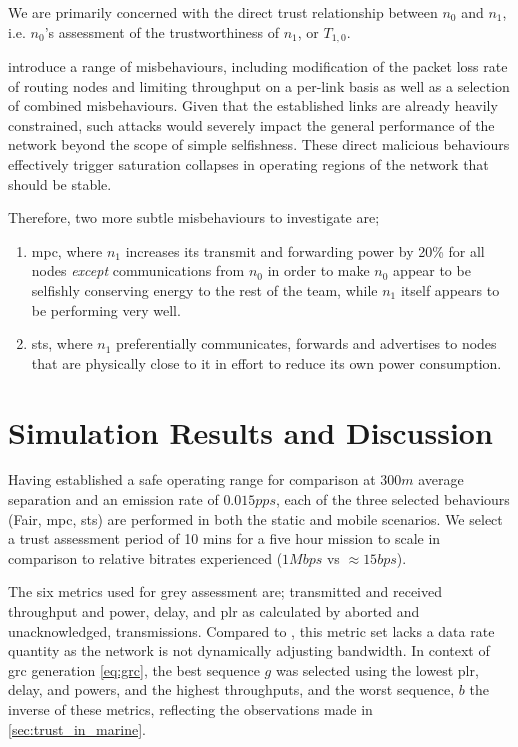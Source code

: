We are primarily concerned with the direct trust relationship between $n_0$ and $n_1$, i.e. $n_0$'s assessment of the trustworthiness of $n_1$, or $T_{1,0}$.

\citet{Guo11} introduce a range of misbehaviours, including modification of the packet loss rate of routing nodes and limiting throughput on a per-link basis as well as a selection of combined misbehaviours. 
Given that the established links are already heavily constrained, such attacks would severely impact the general performance of the network beyond the scope of simple selfishness.
These direct malicious behaviours effectively trigger saturation collapses in operating regions of the network that should be stable.

Therefore, two more subtle misbehaviours to investigate are; 
\begin{enumerate}
	\item \acrfull{mpc}, where $n_1$ increases its transmit and forwarding power by 20\% for all nodes \emph{except} communications from $n_0$ in order to make $n_0$ appear to be selfishly conserving energy to the rest of the team, while $n_1$ itself appears to be performing very well.
	\item \acrfull{sts}, where $n_1$ preferentially communicates, forwards and advertises to nodes that are physically close to it in effort to reduce its own power consumption.
\end{enumerate}


\section{Simulation Results and Discussion}\label{sec:trustresultsanddiscussion}

Having established a safe operating range for comparison at $300m$ average separation and an emission rate of $0.015pps$, each of the three selected behaviours (Fair, \gls{mpc}, \gls{sts}) are performed in both the static and mobile scenarios. 
We select a trust assessment period of 10 mins for a five hour mission to scale in comparison to relative bitrates experienced ($1Mbps$ vs $\approx15bps$).

The six metrics used for grey assessment are; transmitted and received throughput and power, delay, and \gls{plr} as calculated by aborted and unacknowledged, transmissions.
Compared to \cite{Guo11}, this metric set lacks a data rate quantity as the network is not dynamically adjusting bandwidth.
In context of \gls{grc} generation \eqref{eq:grc}, the best sequence $g$ was selected using the lowest \gls{plr}, delay, and powers, and the highest throughputs, and the worst sequence, $b$ the inverse of these metrics, reflecting the observations made in \autoref{sec:trust_in_marine}.

